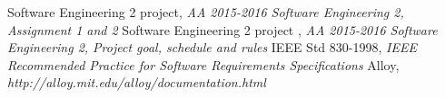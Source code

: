 \begingroup
    \renewcommand{\section}[2]{}%
    \begin{thebibliography}{1}
            Software Engineering 2 project,
            \emph{AA 2015-2016 Software Engineering 2, Assignment 1 and 2}
            Software Engineering 2 project ,
            \emph{AA 2015-2016 Software Engineering 2, Project goal, schedule and rules}
            IEEE Std 830-1998,
            \emph{IEEE Recommended Practice for Software Requirements Specifications}
            Alloy,
            \emph{http://alloy.mit.edu/alloy/documentation.html}
    \end{thebibliography}
\endgroup